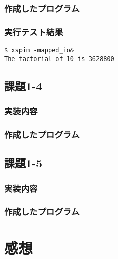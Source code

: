 \documentclass[a4j,11pt]{jarticle}
\begin{document}
  \subsubsection{作成したプログラム}
   
  \subsubsection{実行テスト結果}
\begin{verbatim}
$ xspim -mapped_io&
The factorial of 10 is 3628800
\end{verbatim}

 \subsection{課題1-4}
  \subsubsection{実装内容}
  \subsubsection{作成したプログラム}
   


 \subsection{課題1-5}
  \subsubsection{実装内容}
  \subsubsection{作成したプログラム}
   

\section{感想}
\end{document}
